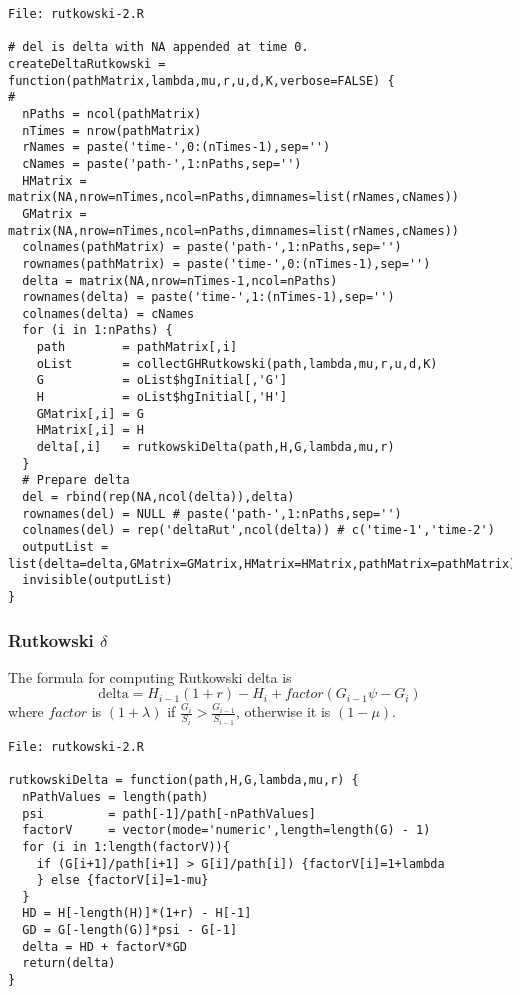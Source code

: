 \documentclass[10pt]{article}
\begin{document}
\begin{verbatim}
File: rutkowski-2.R

# del is delta with NA appended at time 0.
createDeltaRutkowski = function(pathMatrix,lambda,mu,r,u,d,K,verbose=FALSE) {
#
  nPaths = ncol(pathMatrix)
  nTimes = nrow(pathMatrix)
  rNames = paste('time-',0:(nTimes-1),sep='')
  cNames = paste('path-',1:nPaths,sep='')
  HMatrix = matrix(NA,nrow=nTimes,ncol=nPaths,dimnames=list(rNames,cNames))
  GMatrix = matrix(NA,nrow=nTimes,ncol=nPaths,dimnames=list(rNames,cNames))
  colnames(pathMatrix) = paste('path-',1:nPaths,sep='')
  rownames(pathMatrix) = paste('time-',0:(nTimes-1),sep='')
  delta = matrix(NA,nrow=nTimes-1,ncol=nPaths)
  rownames(delta) = paste('time-',1:(nTimes-1),sep='')
  colnames(delta) = cNames
  for (i in 1:nPaths) {
    path        = pathMatrix[,i]
    oList       = collectGHRutkowski(path,lambda,mu,r,u,d,K)
    G           = oList$hgInitial[,'G']
    H           = oList$hgInitial[,'H']
    GMatrix[,i] = G
    HMatrix[,i] = H
    delta[,i]   = rutkowskiDelta(path,H,G,lambda,mu,r)
  }
  # Prepare delta
  del = rbind(rep(NA,ncol(delta)),delta)
  rownames(del) = NULL # paste('path-',1:nPaths,sep='')
  colnames(del) = rep('deltaRut',ncol(delta)) # c('time-1','time-2')
  outputList = list(delta=delta,GMatrix=GMatrix,HMatrix=HMatrix,pathMatrix=pathMatrix)
  invisible(outputList)
}
\end{verbatim}

\subsubsection*{Rutkowski $\delta$}

The formula for computing Rutkowski delta is
\[
\text{delta} = H_{i-1}(1+r) - H_i + factor (G_{i-1} \psi - G_i)
\]
where $factor$ is $(1+\lambda)$ if $\frac{G_i}{S_i} > \frac{G_{i-1}}{S_{i-1}}$, otherwise it is $(1-\mu)$.

\begin{verbatim}
File: rutkowski-2.R

rutkowskiDelta = function(path,H,G,lambda,mu,r) {
  nPathValues = length(path)
  psi         = path[-1]/path[-nPathValues]
  factorV     = vector(mode='numeric',length=length(G) - 1)
  for (i in 1:length(factorV)){
    if (G[i+1]/path[i+1] > G[i]/path[i]) {factorV[i]=1+lambda
    } else {factorV[i]=1-mu}
  }
  HD = H[-length(H)]*(1+r) - H[-1]
  GD = G[-length(G)]*psi - G[-1]
  delta = HD + factorV*GD
  return(delta)
}
\end{verbatim}
\end{document}
